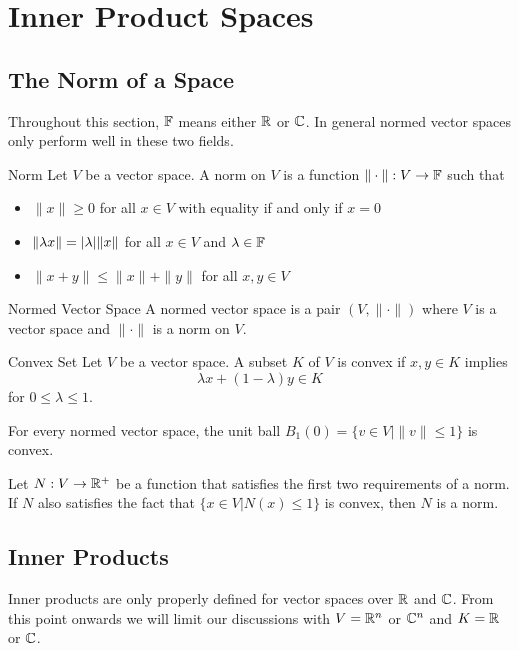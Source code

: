 \documentclass[a4paper]{article}
\begin{document}
\pagebreak
\section{Inner Product Spaces}
\subsection{The Norm of a Space}
Throughout this section, $\mathbb{F}$ means either $\mathbb{R}$ or $\mathbb{C}$. In general normed vector spaces only perform well in these two fields. 
\begin{defn}{Norm}{} Let $V$ be a vector space. A norm on $V$ is a function $\|\cdot\|:V\to\mathbb{F}$ such that
\begin{itemize}
\item $\|x\|\geq 0$ for all $x\in V$ with equality if and only if $x=0$
\item $\|\lambda x\|=\abs{\lambda}\|x\|$ for all $x\in V$ and $\lambda\in\mathbb{F}$
\item $\|x+y\|\leq\|x\|+\|y\|$ for all $x,y\in V$
\end{itemize}
\end{defn}

\begin{defn}{Normed Vector Space}{} A normed vector space is a pair $(V,\|\cdot\|)$ where $V$ is a vector space and $\|\cdot\|$ is a norm on $V$. 
\end{defn}

\begin{defn}{Convex Set}{} Let $V$ be a vector space. A subset $K$ of $V$ is convex if $x,y\in K$ implies $$\lambda x+(1-\lambda)y\in K$$ for $0\leq\lambda\leq 1$. 
\end{defn}

\begin{lmm}{}{} For every normed vector space, the unit ball $B_1(0)=\{v\in V|\|v\|\leq 1\}$ is convex. 
\end{lmm}

\begin{prp}{}{} Let $N:V\to\mathbb{R}^+$ be a function that satisfies the first two requirements of a norm. If $N$ also satisfies the fact that $\{x\in V|N(x)\leq 1\}$ is convex, then $N$ is a norm. 
\end{prp}

\subsection{Inner Products}
Inner products are only properly defined for vector spaces over $\mathbb{R}$ and $\mathbb{C}$. From this point onwards we will limit our discussions with $V=\mathbb{R}^n$ or $\mathbb{C}^n$ and $K=\mathbb{R}$ or $\mathbb{C}$. 
\end{document}
